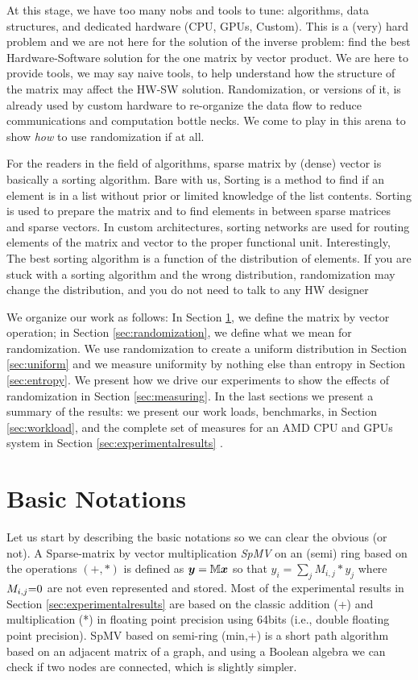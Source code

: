 \documentclass[manuscript,screen]{acmart}
\begin{document}
At this stage, we have too many nobs and tools to tune: algorithms,
data structures, and dedicated hardware (CPU, GPUs, Custom). This is a
(very) hard problem and we are not here for the solution of the
inverse problem: find the best Hardware-Software solution for the one
matrix by vector product. We are here to provide tools, we may say
naive tools, to help understand how the structure of the matrix may
affect the HW-SW solution. Randomization, or versions of it, is
already used by custom hardware to re-organize the data flow to reduce
communications and computation bottle necks. We come to play in this
arena to show {\em how} to use randomization if at all.

For the readers in the field of algorithms, sparse matrix by (dense)
vector is basically a sorting algorithm. Bare with us, Sorting is a
method to find if an element is in a list without prior or limited
knowledge of the list contents. Sorting is used to prepare the matrix
and to find elements in between sparse matrices and sparse vectors. In
custom architectures, sorting networks are used for routing elements
of the matrix and vector to the proper functional unit. Interestingly,
The best sorting algorithm is a function of the distribution of
elements. If you are stuck with a sorting algorithm and the wrong
distribution, randomization may change the distribution, and you do
not need to talk to any HW designer

We organize our work as follows: In Section \ref{sec:notations}, we
define the matrix by vector operation; in Section
\ref{sec:randomization}, we define what we mean for randomization. We
use randomization to create a uniform distribution in Section
\ref{sec:uniform} and we measure uniformity by nothing else than
entropy in Section \ref{sec:entropy}. We present how we drive our
experiments to show the effects of randomization in Section
\ref{sec:measuring}. In the last sections we present a summary of the
results: we present our work loads, benchmarks, in Section
\ref{sec:workload}, and the complete set of measures for an AMD CPU
and GPUs system in Section \ref{sec:experimentalresults} .

\section{Basic Notations}
\label{sec:notations}
Let us start by describing the basic notations so we can clear the
obvious (or not).  A Sparse-matrix by vector multiplication {\em SpMV}
on an (semi) ring based on the operations $(+,*)$ is defined as
${\boldsymbol y} = \mathbb{M} {\boldsymbol x}$ so that $y_i = \sum_j M_{i,j}*y_j$ where $M_{i,j}
{=} 0$ are not even represented and stored. Most of the experimental
results in Section \ref{sec:experimentalresults} are based on the
classic addition (+) and multiplication (*) in floating point
precision using 64bits (i.e., double floating point precision).  SpMV
based on semi-ring (min,+) is a short path algorithm based on an
adjacent matrix of a graph, and using a Boolean algebra we can check
if two nodes are connected, which is slightly simpler.
\end{document}
